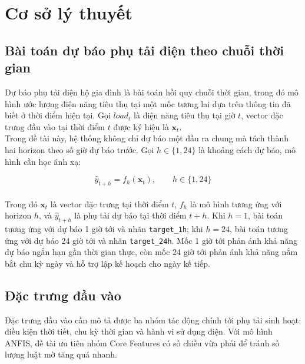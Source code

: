 \chapter{Cơ sở lý thuyết}

\section{Bài toán dự báo phụ tải điện theo chuỗi thời gian}

Dự báo phụ tải điện hộ gia đình là bài toán hồi quy chuỗi thời gian, trong đó mô hình ước lượng điện năng tiêu thụ tại một mốc tương lai dựa trên thông tin đã biết ở thời điểm hiện tại. Gọi $load_t$ là điện năng tiêu thụ tại giờ $t$, vector đặc trưng đầu vào tại thời điểm $t$ được ký hiệu là $\mathbf{x}_t$.
\\
Trong đề tài này, hệ thống không chỉ dự báo một đầu ra chung mà tách thành hai horizon theo số giờ dự báo trước. Gọi $h \in \{1, 24\}$ là khoảng cách dự báo, mô hình cần học ánh xạ:

\begin{equation}
  \hat{y}_{t+h} = f_h(\mathbf{x}_t), \qquad h \in \{1, 24\}
\end{equation}
\\
Trong đó $\mathbf{x}_t$ là vector đặc trưng tại thời điểm $t$, $f_h$ là mô hình tương ứng với horizon $h$, và $\hat{y}_{t+h}$ là phụ tải dự báo tại thời điểm $t+h$. Khi $h=1$, bài toán tương ứng với dự báo 1 giờ tới và nhãn \texttt{target\_1h}; khi $h=24$, bài toán tương ứng với dự báo 24 giờ tới và nhãn \texttt{target\_24h}. Mốc 1 giờ tới phản ánh khả năng dự báo ngắn hạn gần thời gian thực, còn mốc 24 giờ tới phản ánh khả năng nắm bắt chu kỳ ngày và hỗ trợ lập kế hoạch cho ngày kế tiếp.

\section{Đặc trưng đầu vào}

Đặc trưng đầu vào cần mô tả được ba nhóm tác động chính tới phụ tải sinh hoạt: điều kiện thời tiết, chu kỳ thời gian và hành vi sử dụng điện. Với mô hình ANFIS, đề tài ưu tiên nhóm Core Features có số chiều vừa phải để tránh số lượng luật mờ tăng quá nhanh.

